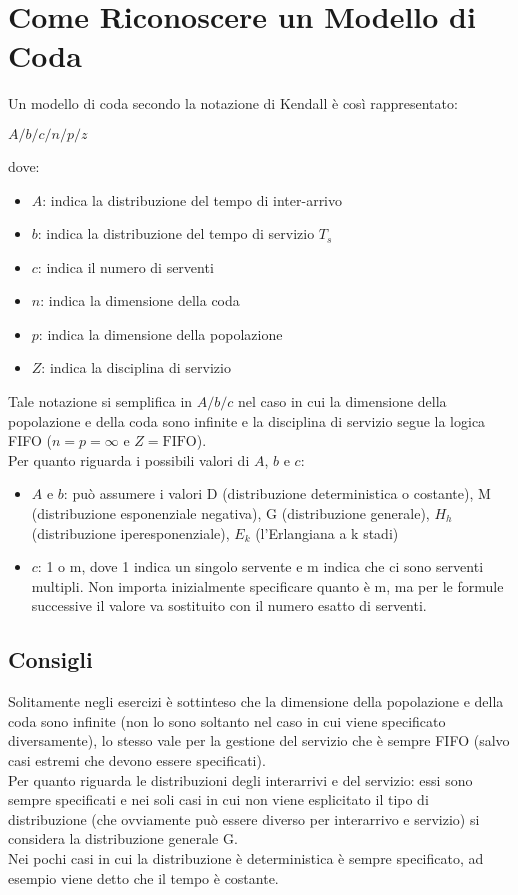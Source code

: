 \section{Come Riconoscere un Modello di Coda}
Un modello di coda secondo la notazione di Kendall è così rappresentato:
\begin{center}
    $A/b/c/n/p/z$
\end{center}

dove:

\begin{itemize}
    \item $A$: indica la distribuzione del tempo di inter-arrivo
    \item $b$: indica la distribuzione del tempo di servizio $T_s$
    \item $c$: indica il numero di serventi
    \item $n$: indica la dimensione della coda
    \item $p$: indica la dimensione della popolazione
    \item $Z$: indica la disciplina di servizio
\end{itemize}
Tale notazione si semplifica in $A/b/c$ nel caso in cui la dimensione della
popolazione e della coda sono infinite e la disciplina di servizio segue la
logica FIFO ($n = p = \infty$ e $Z = \text{FIFO}$).\\
Per quanto riguarda i possibili valori di $A$, $b$ e $c$:

\begin{itemize}
    \item $A$ e $b$: può assumere i valori D (distribuzione deterministica o
          costante), M (distribuzione esponenziale negativa), G (distribuzione
          generale), $H_h$ (distribuzione iperesponenziale), $E_k$ (l'Erlangiana
          a k stadi)
    \item $c$: 1 o m, dove 1 indica un singolo servente e m indica che ci sono
          serventi multipli. Non importa inizialmente specificare quanto è m, ma
          per le formule successive il valore va sostituito con il numero esatto
          di serventi.
\end{itemize}

\subsection*{Consigli}
Solitamente negli esercizi è sottinteso che la dimensione della popolazione e
della coda sono infinite (non lo sono soltanto nel caso in cui viene specificato
diversamente), lo stesso vale per la gestione del servizio che è sempre FIFO
(salvo casi estremi che devono essere specificati).\\
Per quanto riguarda le distribuzioni degli interarrivi e del servizio: essi sono
sempre specificati e nei soli casi in cui non viene esplicitato il tipo di
distribuzione (che ovviamente può essere diverso per interarrivo e servizio) si
considera la distribuzione generale G.\\
Nei pochi casi in cui la distribuzione è deterministica è sempre specificato, ad
esempio viene detto che il tempo è costante.

